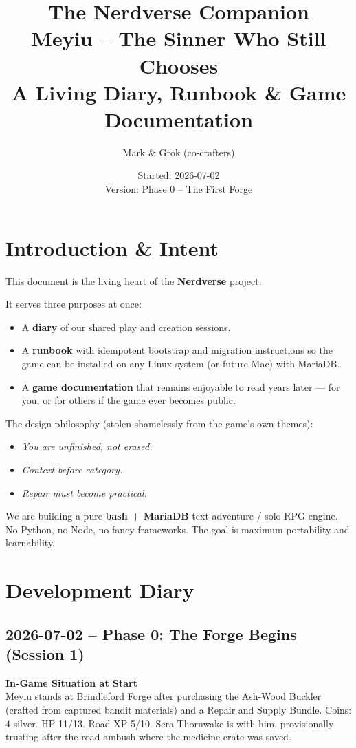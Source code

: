 \documentclass[11pt,a4paper]{article}
\title{\textbf{The Nerdverse Companion}\\[0.3em]
\large Meyiu -- The Sinner Who Still Chooses \\[0.5em]
\normalsize A Living Diary, Runbook \& Game Documentation}
\author{Mark \& Grok (co-crafters)}
\date{Started: 2026-07-02 \\ Version: Phase 0 -- The First Forge}
\begin{document}
\maketitle
\tableofcontents
\newpage

\section{Introduction \& Intent}

This document is the living heart of the \textbf{Nerdverse} project.

It serves three purposes at once:
\begin{itemize}
  \item A \textbf{diary} of our shared play and creation sessions.
  \item A \textbf{runbook} with idempotent bootstrap and migration instructions so the game can be installed on any Linux system (or future Mac) with MariaDB.
  \item A \textbf{game documentation} that remains enjoyable to read years later — for you, or for others if the game ever becomes public.
\end{itemize}

The design philosophy (stolen shamelessly from the game's own themes):
\begin{itemize}
  \item \textit{You are unfinished, not erased.}
  \item \textit{Context before category.}
  \item \textit{Repair must become practical.}
\end{itemize}

We are building a pure \textbf{bash + MariaDB} text adventure / solo RPG engine. No Python, no Node, no fancy frameworks. The goal is maximum portability and learnability.

\section{Development Diary}

\subsection{2026-07-02 -- Phase 0: The Forge Begins (Session 1)}

\textbf{In-Game Situation at Start}\\
Meyiu stands at Brindleford Forge after purchasing the Ash-Wood Buckler (crafted from captured bandit materials) and a Repair and Supply Bundle. Coins: 4 silver. HP 11/13. Road XP 5/10. Sera Thornwake is with him, provisionally trusting after the road ambush where the medicine crate was saved.
\end{document}
